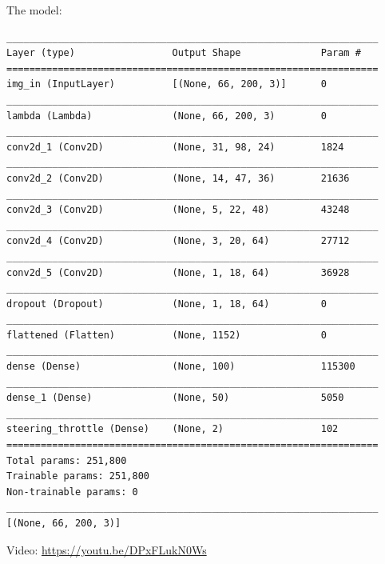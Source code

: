 The model:
\begin{verbatim}
_________________________________________________________________
Layer (type)                 Output Shape              Param #   
=================================================================
img_in (InputLayer)          [(None, 66, 200, 3)]      0         
_________________________________________________________________
lambda (Lambda)              (None, 66, 200, 3)        0         
_________________________________________________________________
conv2d_1 (Conv2D)            (None, 31, 98, 24)        1824      
_________________________________________________________________
conv2d_2 (Conv2D)            (None, 14, 47, 36)        21636     
_________________________________________________________________
conv2d_3 (Conv2D)            (None, 5, 22, 48)         43248     
_________________________________________________________________
conv2d_4 (Conv2D)            (None, 3, 20, 64)         27712     
_________________________________________________________________
conv2d_5 (Conv2D)            (None, 1, 18, 64)         36928     
_________________________________________________________________
dropout (Dropout)            (None, 1, 18, 64)         0         
_________________________________________________________________
flattened (Flatten)          (None, 1152)              0         
_________________________________________________________________
dense (Dense)                (None, 100)               115300    
_________________________________________________________________
dense_1 (Dense)              (None, 50)                5050      
_________________________________________________________________
steering_throttle (Dense)    (None, 2)                 102       
=================================================================
Total params: 251,800
Trainable params: 251,800
Non-trainable params: 0
_________________________________________________________________
[(None, 66, 200, 3)]    
\end{verbatim}

Video: \url{https://youtu.be/DPxFLukN0Ws}


